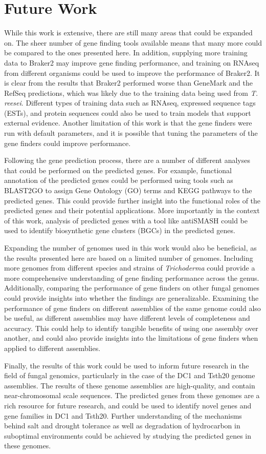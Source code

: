 \section{Future Work}

While this work is extensive, there are still many areas that could be
expanded on. The sheer number of gene finding tools available means
that many more could be compared to the ones presented here. In
addition, supplying more training data to Braker2 may improve gene
finding performance, and training on RNAseq from different organisms
could be used to improve the performance of Braker2. It is clear from
the results that Braker2 performed worse than GeneMark and the RefSeq
predictions, which was likely due to the training data being used from
\textit{T. reesei}. Different types of training data such as RNAseq,
expressed sequence tags (ESTs), and protein sequences could also be
used to train models that support external evidence. Another
limitation of this work is that the gene finders were run with default
parameters, and it is possible that tuning the parameters of the gene
finders could improve performance.

Following the gene prediction process, there are a number of different
analyses that could be performed on the predicted genes. For example,
functional annotation of the predicted genes could be performed using
tools such as BLAST2GO to assign Gene Ontology (GO) terms and KEGG
pathways to the predicted genes. This could provide further insight
into the functional roles of the predicted genes and their potential
applications. More importantly in the context of this work, analysis
of predicted genes with a tool like antiSMASH could be used to
identify biosynthetic gene clusters (BGCs) in the predicted genes.

Expanding the number of genomes used in this work would also be
beneficial, as the results presented here are based on a limited
number of genomes. Including more genomes from different species and
strains of \textit{Trichoderma} could provide a more comprehensive
understanding of gene finding performance across the
genus. Additionally, comparing the performance of gene finders on
other fungal genomes could provide insights into whether the findings
are generalizable. Examining the performance of gene finders on
different assemblies of the same genome could also be useful, as
different assemblies may have different levels of completeness and
accuracy. This could help to identify tangible benefits of using one
assembly over another, and could also provide insights into the
limitations of gene finders when applied to different assemblies.

Finally, the results of this work could be used to inform future
research in the field of fungal genomics, particularly in the case of
the DC1 and Tsth20 genome assemblies. The results of these genome
assemblies are high-quality, and contain near-chromosomal scale
sequences. The predicted genes from these genomes are a rich resource
for future research, and could be used to identify novel genes and
gene families in DC1 and Tsth20. Further understanding of the
mechanisms behind salt and drought tolerance as well as degradation of
hydrocarbon in suboptimal environments could be achieved by studying
the predicted genes in these genomes.

